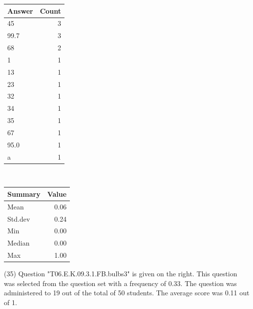 \documentclass[12pt,english,nohyper]{tufte-handout}\usepackage[]{graphicx}\usepackage[]{color}
\begin{document}
\begin{center}%
\begin{tabular}{lr}
  \hline
Answer & Count \\ 
  \hline
45 &   3 \\ 
  99.7 &   3 \\ 
  68 &   2 \\ 
  1 &   1 \\ 
  13 &   1 \\ 
  23 &   1 \\ 
  32 &   1 \\ 
  34 &   1 \\ 
  35 &   1 \\ 
  67 &   1 \\ 
  95.0 &   1 \\ 
  a &   1 \\ 
   \hline
\end{tabular}
~~~~~~~~%
\begin{tabular}{lr}
  \hline
Summary & Value \\ 
  \hline
Mean & 0.06 \\ 
  Std.dev & 0.24 \\ 
  Min & 0.00 \\ 
  Median & 0.00 \\ 
  Max & 1.00 \\ 
   \hline
\end{tabular}
\end{center}\newpage{} (35) Question "T06.E.K.09.3.1.FB.bulbs3" is given on the right. This question was selected from the question set with a frequency of 0.33. The question was administered to 19 out of the total of 50 students. The average score was 0.11 out of 1.
\end{document}
